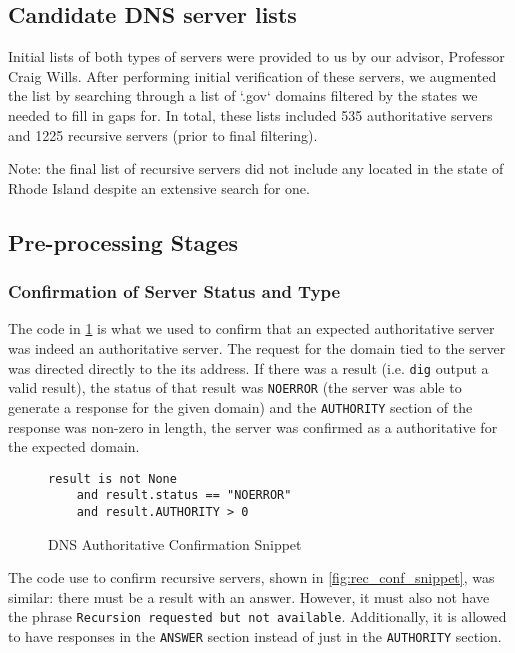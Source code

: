 \subsection{Candidate DNS server lists}

Initial lists of both types of \dns servers were provided to us by our advisor, Professor Craig Wills. After performing initial verification of these servers, we augmented the list by searching through a list of `.gov` domains filtered by the states we needed to fill in gaps for. In total, these lists included 535 authoritative servers and 1225 recursive servers (prior to final filtering).

Note: the final list of recursive servers did not include any located in the state of Rhode Island despite an extensive search for one.

\subsection{Pre-processing Stages}

\subsubsection{Confirmation of Server Status and Type}

The code in \cref{fig:auth_conf_snippet} is what we used to confirm that an expected authoritative server was indeed an authoritative server. The request for the domain tied to the server was directed directly to the its \ip address. If there was a result (i.e. \texttt{dig} output a valid result), the status of that result was \texttt{NOERROR} (the server was able to generate a response for the given domain) and the \texttt{AUTHORITY} section of the response was non-zero in length, the server was confirmed as a authoritative for the expected domain.
\begin{figure}[H]
\centering
    \begin{verbatim}
result is not None 
    and result.status == "NOERROR" 
    and result.AUTHORITY > 0
    \end{verbatim}
    \caption{DNS Authoritative Confirmation Snippet}
    \label{fig:auth_conf_snippet}
\end{figure}

The code use to confirm recursive servers, shown in \cref{fig:rec_conf_snippet}, was similar: there must be a result with an answer. However, it must also not have the phrase \texttt{Recursion requested but not available}. Additionally, it is allowed to have responses in the \texttt{ANSWER} section instead of just in the \texttt{AUTHORITY} section.


